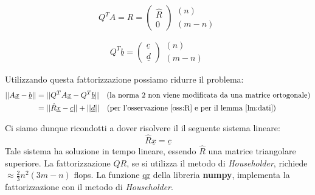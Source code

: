 \documentclass[../main.tex]{subfiles}
\begin{document}
\begin{remark}
    \begin{equation}
        Q^TA = R = \begin{pmatrix}
            \hat{R} \\ 0
        \end{pmatrix}\begin{matrix}
            (n) \\( m-n)
        \end{matrix}
    \end{equation}\label{oss:R}
\end{remark}

\begin{lemma}
    \begin{equation}
        Q^T\underline{b} =\begin{pmatrix}
            \underline{c}\\ \underline{d}
        \end{pmatrix}\begin{matrix}
            (n) \\( m-n)
        \end{matrix}
    \end{equation}\label{lm:dati}   
\end{lemma}

Utilizzando questa fattorizzazione possiamo ridurre il problema:
\begin{align*}
    ||A\underline{x} - \underline{b} ||
    &= ||Q^TA\underline{x} - Q^T\underline{b}|| 
    \quad\text{(la norma 2 non viene modificata da una matrice ortogonale)}\\
    &=||\hat{R}\underline{x} - \underline{c}|| + ||\underline{d}||
    \quad\text{(per l'osservazione \ref*{oss:R} e per il lemma \ref*{lm:dati})}
\end{align*}

Ci siamo dunque ricondotti a dover risolvere il il seguente sistema lineare:
\begin{equation}
    \hat{R}\underline{x} = \underline{c}
    \label{eq:minimi_ridotti}
\end{equation}
Tale sistema ha soluzione in tempo lineare, essendo $\hat{R}$ una matrice triangolare superiore.
La fattorizzazione $QR$, se si utilizza il metodo di \textit{Householder}, richiede $\approx \frac{2}{3}n^2(3m -n)$ flops.
La funzione \href{https://numpy.org/doc/stable/reference/generated/numpy.linalg.qr.html}{qr} della libreria \textbf{numpy}, 
implementa la fattorizzazione con il metodo di \textit{Householder}.
\end{document}
